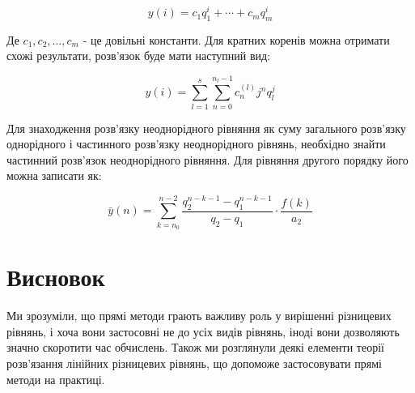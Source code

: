 $$
y(i)=c_{1} q_{1}^{i}+\cdots+c_{m} q_{m}^{i}
$$

Де $c_{1}, c_{2}, \ldots, c_{m}$ - це довільні константи. Для кратних коренів можна отримати схожі результати, розв'язок буде мати наступний вид:


$$
y(i)=\sum_{l=1}^{s} \sum_{n=0}^{n_{l}-1} c_{n}^{(l)} j^{n} q_{l}^{j}
$$

Для знаходження розв'язку неоднорідного рівняння як суму загального розв'язку однорідного і частинного розв'язку неоднорідного рівнянь, необхідно знайти частинний розв'язок неоднорідного рівняння. Для рівняння другого порядку його можна записати як:

$$
\bar{y}(n)=\sum_{k=n_{0}}^{n-2} \frac{q_{2}^{n-k-1}-q_{1}^{n-k-1}}{q_{2}-q_{1}} \cdot \frac{f(k)}{a_{2}}
$$

\section{Висновок}

Ми зрозуміли, що прямі методи грають важливу роль у вирішенні різницевих рівнянь, і хоча вони застосовні не до усіх видів рівнянь, іноді вони дозволяють значно скоротити час обчислень. Також ми розглянули деякі елементи теорії розв'язання лінійних різницевих рівнянь, що допоможе застосовувати прямі методи на практиці.
